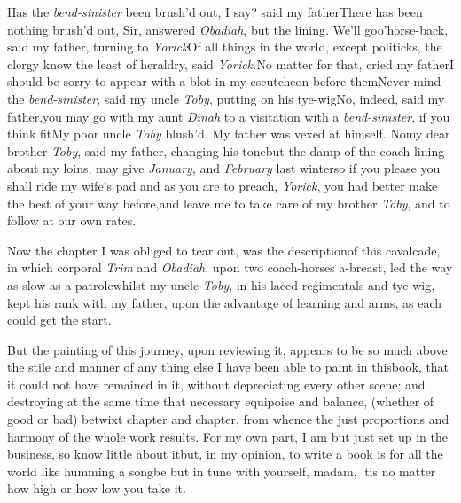\documentclass{article}
\begin{document}
\tsk Has the \textit{bend-sinister} been brush’d out, I
say? said my father\tsk There has been nothing brush’d out, Sir, answered
\textit{Obadiah}, but the lining. We’ll go\break o’horse-back,
said my father, turning to \textit{Yorick}\tsk Of all things in the
world, except politicks, the clergy know the least of heraldry,
said \textit{Yorick.}\tsk No matter for that, cried my
father\tsk I should be sorry to appear with a blot in my
escutcheon before them\tsh Never mind the
\textit{bend-sinister}, said my uncle \textit{Toby}, putting
on his tye-wig\tsh No, indeed, said my father,\break \tsk you
may go with my aunt \textit{Dinah} to a visitation with a
\textit{bend-sinister}, if you think fit\tsk My poor uncle
\textit{Toby} blush’d. My father was vexed at himself.\tsk
No\tsk my dear brother \textit{Toby}, said my father,
changing his tone\tsk but the damp of the coach-lining about
my loins, may give  \textit{January}, and \textit{February} last
winter\tsk so if you please you shall ride my wife’s
pad\break\tsk
and as you are to preach, \textit{Yorick}, you had better
make the best of your way before,\tsk and leave me to take
care of my brother \textit{Toby}, and to follow at our\break
own rates.

Now the chapter I was obliged to tear\break
out, was the descriptionof this cavalcade,\break
in which corporal \textit{Trim} and \textit{Obadiah},\break
upon two coach-horses a-breast, led the\break
way as slow as a patrole\tsk whilst my\break
uncle \textit{Toby}, in his laced regimentals and\break
tye-wig, kept his rank with my father,\break
{}\break
upon the advantage of learning and arms,\break
as each could get the start.


\tsk But the painting of this journey, upon reviewing it,
appears to be so much above the stile and manner of any thing else
I have been able to paint in this\break book, that it could not have
remained in it, without depreciating every other scene; and
destroying at the same time that necessary equipoise and
balance,\break
(whether of good or bad) betwixt chapter and chapter, from whence
the just proportions and harmony of the whole work results. For my
own part, I am but just set up in the business, so know little
about it\tsk but, in my opinion, to write a book is for all the
world like humming a song\tsk be but in tune with yourself,
madam, ’tis no matter how high or how low you take it.\tsk
\end{document}
